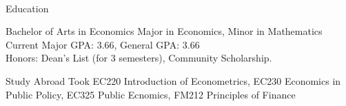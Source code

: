 \documentclass[]{resume-knyte}
\begin{document}



\begin{subheader}{1}
    \\

\end{subheader}

\begin{topic}{Education}


    {Bachelor of Arts in Economics}
    {Major in Economics, Minor in Mathematics\\
    Current Major GPA: 3.66, General GPA: 3.66\\
    Honors: Dean's List (for 3 semesters), Community Scholarship.}


    {Study Abroad}
    {Took EC220 Introduction of Econometrics, EC230 Economics in Public Policy,
    EC325 Public Ecnomics, FM212 Principles of Finance}

    \\ %
\end{topic}
\end{document}
